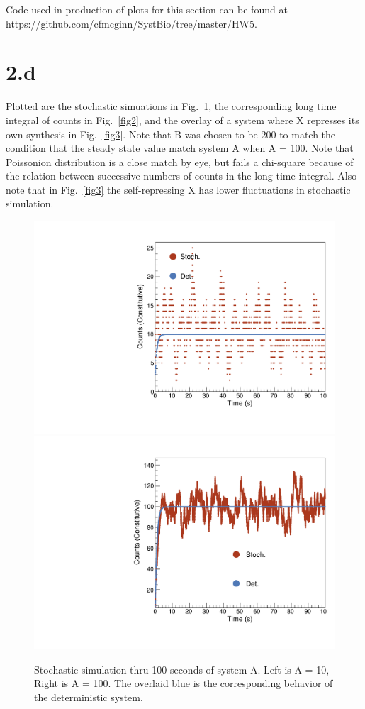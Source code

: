 \documentclass{article}
\begin{document}
Code used in production of plots for this section can be found at https://github.com/cfmcginn/SystBio/tree/master/HW5.
\section{2.d}

Plotted are the stochastic simuations in Fig.~\ref{fig1}, the corresponding long time integral of counts in Fig.~\ref{fig2}, and the overlay of a system where X represses its own synthesis in Fig.~\ref{fig3}. Note that B was chosen to be 200 to match the condition that the steady state value match system A when A = 100. Note that Poissonion distribution is a close match by eye, but fails a chi-square because of the relation between successive numbers of counts in the long time integral. Also note that in Fig.~\ref{fig3} the self-repressing X has lower fluctuations in stochastic simulation.

\begin{figure}[H]
    \centering
    \includegraphics[width=.49\textwidth]{canv10.pdf} 
    \includegraphics[width=.49\textwidth]{canv100.pdf} 
    \caption{Stochastic simulation thru 100 seconds of system A. Left is A = 10, Right is A = 100. The overlaid blue is the corresponding behavior of the deterministic system.}
    \label{fig1}
\end{figure}
\end{document}
